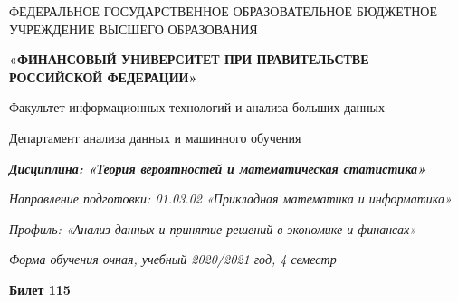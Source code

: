 \documentclass[a4paper,10pt]{article}
\begin{document}
\begin{center}
ФЕДЕРАЛЬНОЕ ГОСУДАРСТВЕННОЕ ОБРАЗОВАТЕЛЬНОЕ БЮДЖЕТНОЕ УЧРЕЖДЕНИЕ ВЫСШЕГО ОБРАЗОВАНИЯ

    \textbf{«ФИНАНСОВЫЙ УНИВЕРСИТЕТ ПРИ ПРАВИТЕЛЬСТВЕ РОССИЙСКОЙ ФЕДЕРАЦИИ»}

Факультет информационных технологий и анализа больших данных

Департамент анализа данных и машинного обучения

\textit{
	\textbf{Дисциплина: «Теория вероятностей и математическая статистика»}}

\textit{Направление подготовки: 01.03.02 «Прикладная математика и информатика»}

\textit{Профиль: «Анализ данных и принятие решений в экономике и финансах»}

\textit{Форма обучения очная, учебный 2020/2021 год, 4 семестр}

\textbf{Билет 115}

\end{center}
\end{document}
